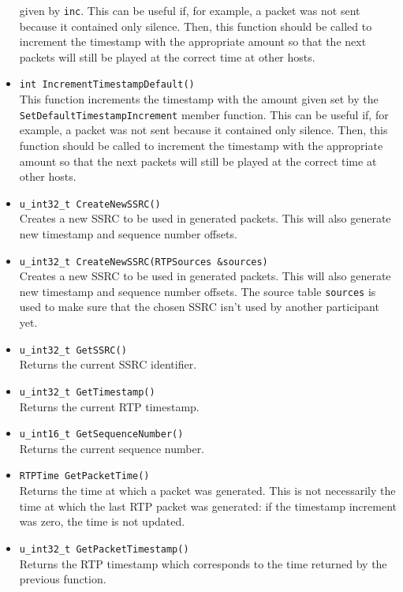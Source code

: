 \documentclass[12pt,a4paper]{article}
\begin{document}
\begin{itemize}
						given by {\tt inc}. This can be useful if, for example,
						a packet was not sent because it contained only silence.
						Then, this function should be called to increment the
						timestamp with the appropriate amount so that the next
						packets will still be played at the correct time at
						other hosts.
					\item {\tt int IncrementTimestampDefault()}\\
						This function increments the timestamp with the amount
						given set by the {\tt SetDefaultTimestampIncrement}
						member function. This can be useful if, for example,
						a packet was not sent because it contained only silence.
						Then, this function should be called to increment the
						timestamp with the appropriate amount so that the next
						packets will still be played at the correct time at
						other hosts.						
					\item {\tt u\_int32\_t CreateNewSSRC()}\\
						Creates a new SSRC to be used in generated packets. This
						will also generate new timestamp and sequence number
						offsets.
					\item {\tt u\_int32\_t CreateNewSSRC(RTPSources \&sources)}\\
						Creates a new SSRC to be used in generated packets. This
						will also generate new timestamp and sequence number
						offsets. The source table {\tt sources} is used to make
						sure that the chosen SSRC isn't used by another participant
						yet.
					\item {\tt u\_int32\_t GetSSRC()}\\
						Returns the current SSRC identifier.
					\item {\tt u\_int32\_t GetTimestamp()}\\
						Returns the current RTP timestamp.
					\item {\tt u\_int16\_t GetSequenceNumber()}\\
						Returns the current sequence number.
					\item {\tt RTPTime GetPacketTime()}\\
						Returns the time at which a packet was generated. This
						is not necessarily the time at which the last RTP packet
						was generated: if the timestamp increment was zero, the
						time is not updated.
					\item {\tt u\_int32\_t GetPacketTimestamp()}\\
						Returns the RTP timestamp which corresponds to the time 
						returned by the previous function.
				\end{itemize}
				
\end{document}
